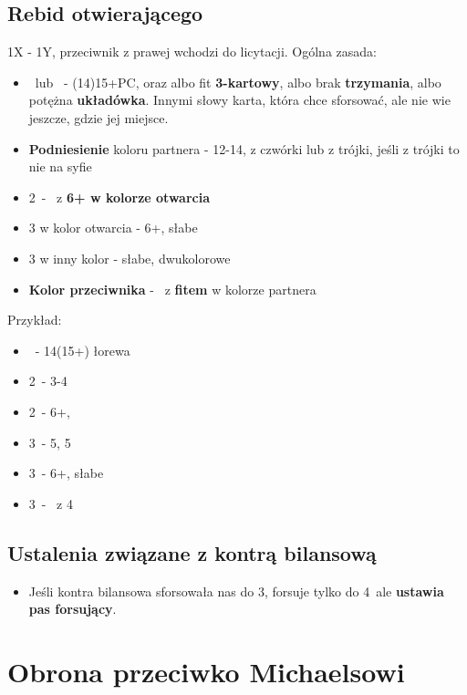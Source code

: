 \documentclass[12pt, a4paper]{article}
\begin{document}
\subsection{Rebid otwierającego}
1X - 1Y, przeciwnik z prawej wchodzi do licytacji.
Ogólna zasada:
\begin{itemize}
    \item \dbl\ lub \rdbl\ - (14)15+PC, oraz albo fit \textbf{3-kartowy}, albo brak \textbf{trzymania},
    albo potężna \textbf{układówka}. Innymi słowy karta,
    która chce sforsować, ale nie wie jeszcze, gdzie jej miejsce.

    \item \textbf{Podniesienie} koloru partnera - 12-14, z czwórki lub z trójki, jeśli z trójki to nie na syfie
    \item 2\nt\ - \inv\ z \textbf{6+ w kolorze otwarcia}
    \item 3 w kolor otwarcia - 6+, słabe
    \item 3 w inny kolor - słabe, dwukolorowe
    \item \textbf{Kolor przeciwnika} - \gf\ z \textbf{fitem} w kolorze partnera
\end{itemize}
Przykład:
\begin{itemize}
    \item \dbl\ - 14(15+) łorewa
    \item 2\spades\ - 3-4\spades
    \item 2\nt\ - 6+\diams, \inv
    \item 3\clubs\ - 5\diams, 5\clubs
    \item 3\diams\ - 6+\diams, słabe
    \item 3\hearts\ - \gf\ z 4\spades
\end{itemize}

\subsection{Ustalenia związane z kontrą bilansową}
\begin{itemize}
    \item Jeśli kontra bilansowa sforsowała nas do 3\nt, forsuje tylko do 4\minor\, ale \textbf{ustawia pas forsujący}.
\end{itemize}



\pagebreak
\section{Obrona przeciwko Michaelsowi}
\end{document}
